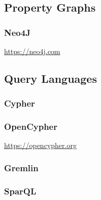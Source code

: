\subsection{Property Graphs}
\subsubsection{Neo4J}

\url{https://neo4j.com}

\subsection{Query Languages}
\subsubsection{Cypher}
\subsubsection{OpenCypher}

\url{https://opencypher.org}

\subsubsection{Gremlin}
\subsubsection{SparQL}


